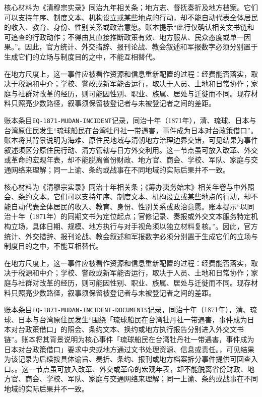 核心材料为《清穆宗实录》同治九年相关条；地方志、督抚奏折及地方档案。它们可以支持年序、制度文本、机构设立或某些地点的行动，却不能自动代表全体居民的收入、教育、身份、性别关系或政治意愿。账本提示“此行仅确认相关文书链和可追查的行政动作；不得由其直接推断政策有效、地方服从、民众态度或单一因果。”。因此，官方统计、外交措辞、报刊论战、教会叙述和军报数字必须分别置于生成它们的立场与制度目的之中，不能互相替代。

在地方尺度上，这一事件应被看作资源和信息重新配置的过程：经费能否落实，取决于税源和中介；学校、警政或新军能否运行，取决于人员、土地和日常协作；家庭与社群对改革的经历，则可能因性别、职业、族属、居处与迁徙而不同。现存材料只照亮少数路径，叙事须保留被登记者与未被登记者之间的差距。

账本条目\texttt{EQ-1871-MUDAN-INCIDENT}记录，同治十年（1871年），清、琉球、日本与台湾原住民发生“琉球船民在台湾牡丹社一带遇害，事件成为日本对台政策借口”。账本将其背景说明为海难、原住民地域与清朝地方治理边界交错，可见结果为事件叙述须区分原住民行动、清方管辖与日方外交利用。这一节点虽可放入改革、外交或革命的宏观年表，却不能脱离省份财政、地方官、商会、学校、军队、家庭与交通网络来理解；同一上谕、条约或战事在不同地域的实际后果并不一致。

核心材料为《清穆宗实录》同治十年相关条；《筹办夷务始末》相关年卷与中外照会、条约文本。它们可以支持年序、制度文本、机构设立或某些地点的行动，却不能自动代表全体居民的收入、教育、身份、性别关系或政治意愿。账本提示“以同治十年（1871年）的同期文书为定位起点；官修记录、奏报或外交文本服务特定机构立场，具体日期、规模、地方执行与对手视角须以独立材料复核。”。因此，官方统计、外交措辞、报刊论战、教会叙述和军报数字必须分别置于生成它们的立场与制度目的之中，不能互相替代。

在地方尺度上，这一事件应被看作资源和信息重新配置的过程：经费能否落实，取决于税源和中介；学校、警政或新军能否运行，取决于人员、土地和日常协作；家庭与社群对改革的经历，则可能因性别、职业、族属、居处与迁徙而不同。现存材料只照亮少数路径，叙事须保留被登记者与未被登记者之间的差距。

账本条目\texttt{EQ-1871-MUDAN-INCIDENT-DOCUMENTS}记录，同治十年（1871年），清、琉球、日本与台湾原住民发生“围绕「琉球船民在台湾牡丹社一带遇害，事件成为日本对台政策借口」的照会、条约文本、换约或地方执行报告分别进入外交文书链”。账本将其背景说明为核心事件「琉球船民在台湾牡丹社一带遇害，事件成为日本对台政策借口」要求中央或地方通过文书处理资源、信息或责任。，可见结果为该记录为后续按具体谕旨、奏折、条约、报刊或地方档案拆分事件提供可回查入口。。这一节点虽可放入改革、外交或革命的宏观年表，却不能脱离省份财政、地方官、商会、学校、军队、家庭与交通网络来理解；同一上谕、条约或战事在不同地域的实际后果并不一致。

